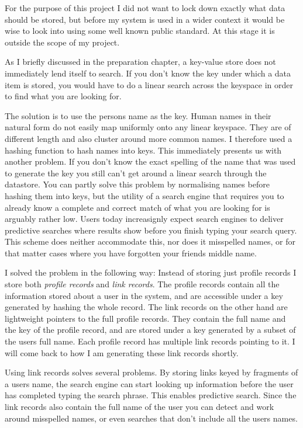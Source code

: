 For the purpose of this project I did not want to lock down exactly what data should be stored, but before my system is used in a wider context it would be wise to look into using some well known public standard. At this stage it is outside the scope of my project.

As I briefly discussed in the preparation chapter, a key-value store does not immediately lend itself to search. If you don't know the key under which a data item is stored, you would have to do a linear search across the keyspace in order to find what you are looking for. 

The solution is to use the persons name as the key. Human names in their natural form do not easily map uniformly onto any linear keyspace. They are of different length and also cluster around more common names. I therefore used a hashing function to hash names into keys. This immediately presents us with another problem. If you don't know the exact spelling of the name that was used to generate the key you still can't get around a linear search through the datastore. You can partly solve this problem by normalising names before hashing them into keys, but the utility of a search engine that requires you to already know a complete and correct match of what you are looking for is arguably rather low. Users today increasignly expect search engines to deliver predictive searches where results show before you finish typing your search query. This scheme does neither accommodate this, nor does it misspelled names, or for that matter cases where you have forgotten your friends middle name.

I solved the problem in the following way: Instead of storing just profile records I store both \emph{profile records} and \emph{link records}. The profile records contain all the information stored about a user in the system, and are accessible under a key generated by hashing the whole record. The link records on the other hand are lightweight pointers to the full profile records. They contain the full name and the key of the profile record, and are stored under a key generated by a subset of the users full name. Each profile record has multiple link records pointing to it. I will come back to how I am generating these link records shortly.

Using link records solves several problems. By storing links keyed by fragments of a users name, the search engine can start looking up information before the user has completed typing the search phrase. This enables predictive search. Since the link records also contain the full name of the user you can detect and work around misspelled names, or even searches that don't include all the users names.

